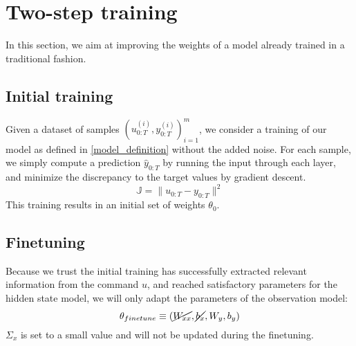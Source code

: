 \documentclass[10pt,a4paper]{article}
\begin{document}
\section{Two-step training}
In this section, we aim at improving the weights of a model already trained in a traditional fashion.

\subsection{Initial training}
Given a dataset of samples $(u_{0:T}^{(i)}, y_{0:T}^{(i)})_{i=1}^m$, we consider a training of our model as defined in \ref{model_definition} without the added noise.
For each sample, we simply compute a prediction $\hat y_{0:T}$ by running the input through each layer, and minimize the discrepancy to the target values by gradient descent.
$$
        \mathbb{J} = \| u_{0:T} - y_{0:T} \|^2
$$
This training results in an initial set of weights $\theta_0$.

\subsection{Finetuning}
Because we trust the initial training has successfully extracted relevant information from the command $u$, and reached satisfactory parameters for the hidden state model, we will only adapt the parameters of the observation model:
$$
        \theta_{finetune} \equiv (\cancel{W_{xx}}, \cancel{b_x}, W_y, b_y)
$$
$\Sigma_x$ is set to a small value and will not be updated during the finetuning.
\end{document}
